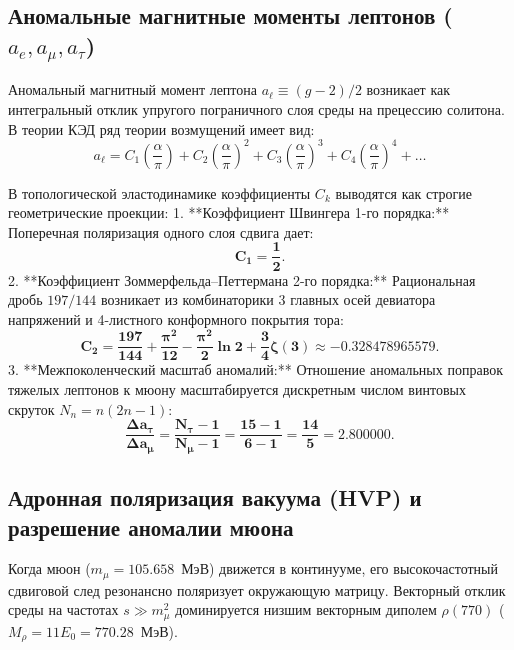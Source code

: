 \documentclass[11pt,a4paper,oneside]{article}
\theoremstyle{plain}
\theoremstyle{definition}
\theoremstyle{remark}
\numberwithin{equation}{section}
\begin{document}
	\subsection{Аномальные магнитные моменты лептонов ($a_e, a_\mu, a_\tau$)}
	
	Аномальный магнитный момент лептона $a_\ell \equiv (g - 2)/2$ возникает как интегральный отклик упругого пограничного слоя среды на прецессию солитона. В теории КЭД ряд теории возмущений имеет вид:
	\begin{equation}
		a_\ell = C_1 \left(\frac{\alpha}{\pi}\right) + C_2 \left(\frac{\alpha}{\pi}\right)^2 + C_3 \left(\frac{\alpha}{\pi}\right)^3 + C_4 \left(\frac{\alpha}{\pi}\right)^4 + \dots
	\end{equation}
	
	В топологической эластодинамике коэффициенты $C_k$ выводятся как строгие геометрические проекции:
	1. **Коэффициент Швингера 1-го порядка:**  
	Поперечная поляризация одного слоя сдвига дает:
	\begin{equation}
		\mathbf{C_1 = \frac{1}{2}}.
	\end{equation}
	2. **Коэффициент Зоммерфельда--Петтермана 2-го порядка:**  
	Рациональная дробь $197/144$ возникает из комбинаторики 3 главных осей девиатора напряжений и 4-листного конформного покрытия тора:
	\begin{equation}
		\mathbf{C_2 = \frac{197}{144} + \frac{\pi^2}{12} - \frac{\pi^2}{2}\ln 2 + \frac{3}{4}\zeta(3) \approx -0.328478965579}.
	\end{equation}
	3. **Межпоколенческий масштаб аномалий:**  
	Отношение аномальных поправок тяжелых лептонов к мюону масштабируется дискретным числом винтовых скруток $N_n = n(2n-1)$:
	\begin{equation}
		\mathbf{\frac{\Delta a_\tau}{\Delta a_\mu} = \frac{N_\tau - 1}{N_\mu - 1} = \frac{15 - 1}{6 - 1} = \frac{14}{5} = \mathbf{2.800000}}.
	\end{equation}
	
	\subsection{Адронная поляризация вакуума (HVP) и разрешение аномалии мюона}
	
	Когда мюон ($m_\mu = 105.658$~МэВ) движется в континууме, его высокочастотный сдвиговой след резонансно поляризует окружающую матрицу. Векторный отклик среды на частотах $s \gg m_\mu^2$ доминируется низшим векторным диполем $\rho(770)$ ($M_\rho = 11 E_0 = 770.28$~МэВ).
	
\end{document}
